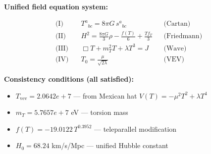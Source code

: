 
\textbf{Unified field equation system:}

\begin{align}
  \text{(I)} \quad & T^a{}_{bc} = 8\pi G \, s^a{}_{bc} && \text{(Cartan)} \\
  \text{(II)} \quad & H^2 = \frac{8\pi G}{3}\rho - \frac{f(T)}{6} + \frac{Tf_T}{3} && \text{(Friedmann)} \\
  \text{(III)} \quad & \Box T + m_T^2 T + \lambda T^3 = J && \text{(Wave)} \\
  \text{(IV)} \quad & T_0 = \frac{\mu}{\sqrt{2\lambda}} && \text{(VEV)}
\end{align}

\textbf{Consistency conditions (all satisfied):}
\begin{itemize}
  \item $T_{\text{vev}} = 2.0642e+7$ — from Mexican hat $V(T) = -\mu^2 T^2 + \lambda T^4$
  \item $m_T = 5.7657e+7$ eV — torsion mass
  \item $f(T) = -19.0122 \, T^{0.3952}$ — teleparallel modification
  \item $H_0 = 68.24$ km/s/Mpc — unified Hubble constant
\end{itemize}